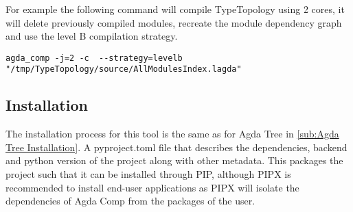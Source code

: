 For example the following command will compile TypeTopology using 2 cores, it
will delete previously compiled modules, recreate the module dependency graph
and use the level B compilation strategy.

\begin{lstlisting}
agda_comp -j=2 -c  --strategy=levelb "/tmp/TypeTopology/source/AllModulesIndex.lagda"
\end{lstlisting}

\subsection{Installation}

The installation process for this tool is the same as for Agda Tree in 
\cref{sub:Agda Tree Installation}. A pyproject.toml file that describes
the dependencies, backend and python version of the project along with
other metadata. This packages the project such that it can be installed through
PIP, although PIPX is recommended to install end-user applications as PIPX will
isolate the dependencies of Agda Comp from the packages of the user.


